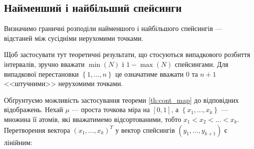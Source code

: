 \subsection{Найменший і найбільший спейсинги}
Визначимо граничні розподіли найменшого і найбільшого спейсингів --- відстаней
між сусідніми нерухомими точками.
\begin{remark}
    Щоб застосувати тут теоретичні результати, що стосуються
    випадкового розбиття інтервалів, зручно вважати
    $\min(N)$ і $1-\max(N)$ спейсингами. Для випадкової
    перестановки $\left\{1, \dots, n\right\}$ це означатиме
    вважати $0$ та $n+1$ <<штучними>> нерухомими точками.
\end{remark}

Обґрунтуємо можливість застосування теореми \ref{th:cont_map} до відповідних відображень.
Нехай $\mu$ --- проста точкова міра на $[0, 1]$,
а $\left\{x_1, ..., x_k\right\}$ --- множина її атомів,
які вважатимемо відсортованими, тобто $x_1 < x_2 < ... < x_k$.
Перетворення вектора $\left(x_1, ..., x_k\right)^T$ у вектор
спейсингів $\left(y_1, ..., y_{k+1}\right)$ є лінійним:
